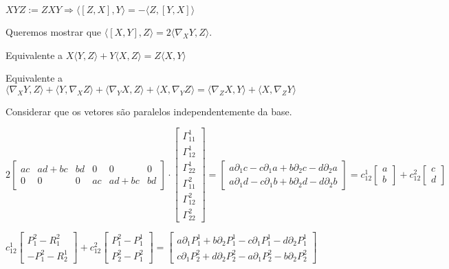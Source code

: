 \documentclass[10pt,a4paper]{article}
\begin{document}
		$XYZ := ZXY \Rightarrow \langle [Z, X], Y \rangle = - \langle Z, [Y, X] \rangle$

		Queremos mostrar que $\langle [X, Y], Z \rangle = 2 \langle \nabla_X Y, Z \rangle$.

		Equivalente a $X \langle Y, Z \rangle + Y \langle X, Z \rangle = Z\langle X, Y \rangle$

		Equivalente a $\langle \nabla_X Y, Z \rangle + \langle Y, \nabla_X Z \rangle + \langle \nabla_Y X, Z \rangle + \langle X, \nabla_Y Z \rangle = \langle \nabla_Z X, Y \rangle + \langle X, \nabla_Z Y \rangle$

		Considerar que os vetores s\~ao paralelos independentemente da base.

		\vspace{3mm}

		$2 \left[ \begin{matrix} ac & ad + bc & bd  & 0 & 0 & 0 \\ 0 & 0 & 0 & ac & ad + bc & bd \end{matrix} \right]\cdot \left[ \begin{matrix} \Gamma_{11}^1 \\ \Gamma_{12}^1 \\ \Gamma_{22}^1 \\ \Gamma_{11}^2 \\ \Gamma_{12}^2 \\ \Gamma_{22}^2 \end{matrix} \right] = \left[ \begin{matrix} a \partial_1 c - c \partial_1 a + b \partial_2 c - d \partial_2 a \\ a \partial_1 d - c \partial_1 b + b \partial_2 d - d \partial_2 b \end{matrix} \right] = c_{12}^1 \left[ \begin{matrix} a \\ b \end{matrix} \right] + c_{12}^2 \left[ \begin{matrix} c \\ d \end{matrix} \right]$

		\vspace{3mm}

		$c_{12}^1 \left[ \begin{matrix} P_1^2 - R_1^2 \\ - P_1^2 - R_2^1 \end{matrix} \right] + c_{12}^2 \left[ \begin{matrix} P_1^2 - P_1^1 \\ P_2^2 - P_1^2 \end{matrix} \right] = \left[ \begin{matrix} a \partial_1 P_1^1 + b \partial_2 P_1^1 - c \partial_1 P_1^1 - d \partial_2 P_1^1 \\ c \partial_1 P_2^2 + d \partial_2 P_2^2 - a \partial_1 P_2^2 - b\partial_2 P_2^2 \end{matrix} \right]$
\end{document}
